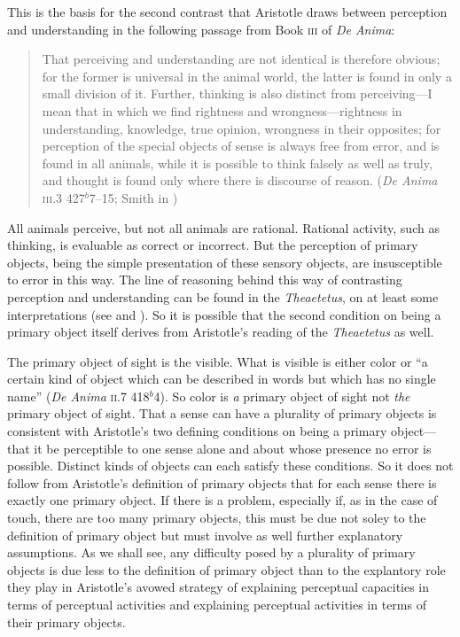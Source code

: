 This is the basis for the second contrast that Aristotle draws between perception and understanding in the following passage from Book \textsc{iii} of \emph{De Anima}:
\begin{quote}
	That perceiving and understanding are not identical is therefore obvious; for the former is universal in the animal world, the latter is found in only a small division of it. Further, thinking is also distinct from perceiving---I mean that in which we find rightness and wrongness---right\-ness in understanding, knowledge, true opinion, wrongness in their opposites; for perception of the special objects of sense is always free from error, and is found in all animals, while it is possible to think falsely as well as truly, and thought is found only where there is discourse of reason. (\emph{De Anima} \textsc{iii}.3 427\( ^{b} \)7--15; Smith in \citealt[49]{Barnes:1984uq})
\end{quote}
All animals perceive, but not all animals are rational. Rational activity, such as thinking, is evaluable as correct or incorrect. But the perception of primary objects, being the simple presentation of these sensory objects, are insusceptible to error in this way. The line of reasoning behind this way of contrasting perception and understanding can be found in the \emph{Theaetetus}, on at least some interpretations (see \citealt{Cooper:1970kx} and \citealt{Burnyeat:1990dp}). So it is possible that the second condition on being a primary object itself derives from Aristotle's reading of the \emph{Theaetetus} as well.

The primary object of sight is the visible. What is visible is either color or ``a certain kind of object which can be described in words but which has no single name'' (\emph{De Anima} \textsc{ii}.7 418\( ^{b} \)4). So color is \emph{a} primary object of sight not \emph{the} primary object of sight. That a sense can have a plurality of primary objects is consistent with Aristotle's two defining conditions on being a primary object---that it be perceptible to one sense alone and about whose presence no error is possible. Distinct kinds of objects can each satisfy these conditions. So it does not follow from Aristotle's definition of primary objects that for each sense there is exactly one primary object. If there is a problem, especially if, as in the case of touch, there are too many primary objects, this must be due not soley to the definition of primary object but must involve as well further explanatory assumptions. As we shall see, any difficulty posed by a plurality of primary objects is due less to the definition of primary object than to the explantory role they play in Aristotle's avowed strategy of explaining perceptual capacities in terms of perceptual activities and explaining perceptual activities in terms of their primary objects.

